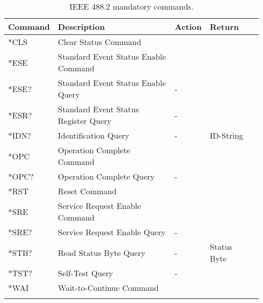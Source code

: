 		\begin{longtable}{|l|l|l|l|l|}				\hline
			Command & 	Description									& 	Action	& Return		\\ \hline
			*CLS	& Clear Status Command							& 		& 		\\ \hline
			*ESE & Standard Event Status Enable Command	& 		& 		\\ \hline
			*ESE? & Standard Event Status Enable Query 		& -		& 		\\ \hline
			*ESR? & Standard Event Status Register Query 	& -		& 		\\ \hline
			*IDN? & Identification Query 							& 	-	& ID-String \\ \hline
			*OPC & Operation Complete Command 				& 		& 		\\ \hline
			*OPC? & Operation Complete Query 					& 	-	& 		\\ \hline
			*RST & Reset Command 									& 		& 		\\ \hline
			*SRE & Service Request Enable Command 			& 		& 		\\ \hline
			*SRE? & Service Request Enable Query 				& 	-	& 		\\ \hline
			*STB? & Read Status Byte Query 						& 	-	& Status Byte		\\ \hline
			*TST? & Self-Test Query 									& 	-	& 		\\ \hline
			*WAI & Wait-to-Continue Command 					& 		& 		\\ \hline
			\caption{IEEE 488.2 mandatory commands.}
		\end{longtable}
		
